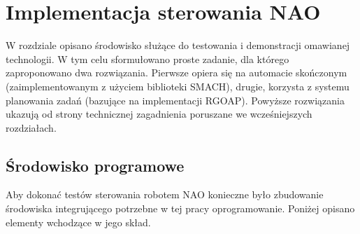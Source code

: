\chapter{Implementacja sterowania NAO}
\label{chap:implementacja}

W rozdziale opisano środowisko służące do testowania i demonstracji omawianej technologii. W tym celu sformułowano proste zadanie, dla którego zaproponowano dwa rozwiązania. Pierwsze opiera się na automacie skończonym (zaimplementowanym z użyciem biblioteki SMACH),
drugie, korzysta z systemu planowania zadań (bazujące na implementacji RGOAP).%
Powyższe rozwiązania ukazują od strony technicznej zagadnienia poruszane we wcześniejszych rozdziałach.

\section{Środowisko programowe}
\label{sec:srodowisko}

Aby dokonać testów sterowania robotem NAO konieczne było zbudowanie środowiska integrującego potrzebne w tej pracy oprogramowanie. Poniżej opisano elementy wchodzące w jego skład. 

